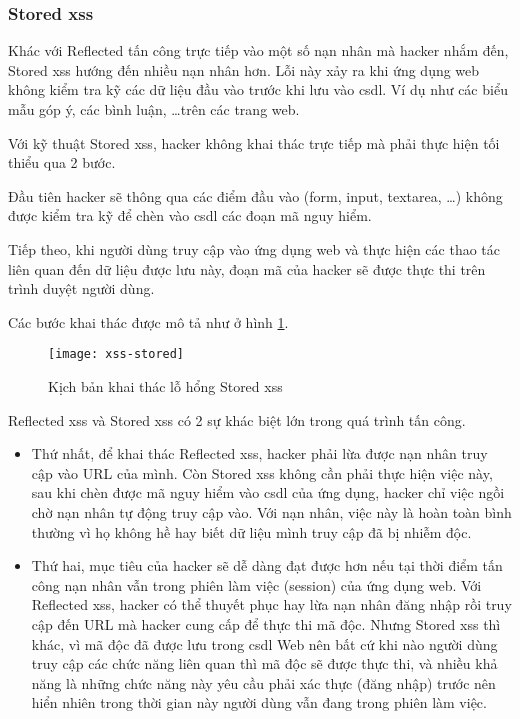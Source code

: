 \documentclass[../main-report.tex]{subfiles}
\begin{document}
\subsubsection*{Stored \acrshort{xss}}
Khác với Reflected tấn công trực tiếp vào một số nạn nhân mà hacker nhắm đến, Stored \acrshort{xss} hướng đến nhiều nạn nhân hơn. Lỗi này xảy ra khi ứng dụng web không kiểm tra kỹ các dữ liệu đầu vào trước khi lưu vào \acrshort{csdl}. Ví dụ như các biểu mẫu góp ý, các bình luận, \ldots trên các trang web.

Với kỹ thuật Stored \acrshort{xss}, hacker không khai thác trực tiếp mà phải thực hiện tối thiểu qua 2 bước.

Đầu tiên hacker sẽ thông qua các điểm đầu vào (form, input, textarea, \ldots) không được kiểm tra kỹ để chèn vào \acrshort{csdl} các đoạn mã nguy hiểm.

Tiếp theo, khi người dùng truy cập vào ứng dụng web và thực hiện các thao tác liên quan đến dữ liệu được lưu này, đoạn mã của hacker sẽ được thực thi trên trình duyệt người dùng.

Các bước khai thác được mô tả như ở hình \ref{fig:xss_stored}.

\begin{figure}[ht!]
\centering\texttt{[image: xss-stored]}
\caption{Kịch bản khai thác lỗ hổng Stored \acrshort{xss}}
\label{fig:xss_stored}
\end{figure}

Reflected \acrshort{xss} và Stored \acrshort{xss} có 2 sự khác biệt lớn trong quá trình tấn công.

\begin{itemize}
\item Thứ nhất, để khai thác Reflected \acrshort{xss}, hacker phải lừa được nạn nhân truy cập vào URL của mình. Còn Stored \acrshort{xss} không cần phải thực hiện việc này, sau khi chèn được mã nguy hiểm vào \acrshort{csdl} của ứng dụng, hacker chỉ việc ngồi chờ nạn nhân tự động truy cập vào. Với nạn nhân, việc này là hoàn toàn bình thường vì họ không hề hay biết dữ liệu mình truy cập đã bị nhiễm độc.
\item Thứ hai, mục tiêu của hacker sẽ dễ dàng đạt được hơn nếu tại thời điểm tấn công nạn nhân vẫn trong phiên làm việc (session) của ứng dụng web. Với Reflected \acrshort{xss}, hacker có thể thuyết phục hay lừa nạn nhân đăng nhập rồi truy cập đến URL mà hacker cung cấp để thực thi mã độc. Nhưng Stored \acrshort{xss} thì khác, vì mã độc đã được lưu trong \acrshort{csdl} Web nên bất cứ khi nào người dùng truy cập các chức năng liên quan thì mã độc sẽ được thực thi, và nhiều khả năng là những chức năng này yêu cầu phải xác thực (đăng nhập) trước nên hiển nhiên trong thời gian này người dùng vẫn đang trong phiên làm việc.
\end{itemize}
\end{document}
